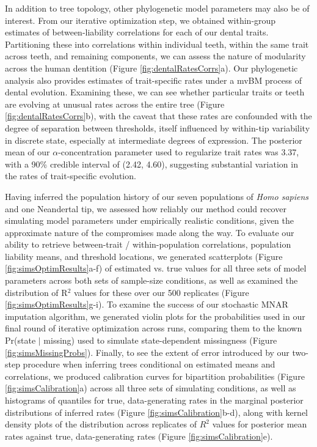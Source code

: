 In addition to tree topology, other phylogenetic model parameters may also be of interest. From our iterative optimization step, we obtained within-group estimates of between-liability correlations for each of our dental traits. Partitioning these into correlations within individual teeth, within the same trait across teeth, and remaining components, we can assess the nature of modularity across the human dentition (Figure \ref{fig:dentalRatesCorrs}a). Our phylogenetic analysis also provides estimates of trait-specific rates under a mvBM process of dental evolution. Examining these, we can see whether particular traits or teeth are evolving at unusual rates across the entire tree (Figure \ref{fig:dentalRatesCorrs}b), with the caveat that these rates are confounded with the degree of separation between thresholds, itself influenced by within-tip variability in discrete state, especially at intermediate degrees of expression. The posterior mean of our $\alpha$-concentration parameter used to regularize trait rates was 3.37, with a 90\% credible interval of (2.42, 4.60), suggesting substantial variation in the rates of trait-specific evolution.

Having inferred the population history of our seven populations of \textit{Homo sapiens} and one Neandertal tip, we assessed how reliably our method could recover simulating model parameters under empirically realistic conditions, given the approximate nature of the compromises made along the way. To evaluate our ability to retrieve between-trait / within-population correlations, population liability means, and threshold locations, we generated scatterplots (Figure \ref{fig:simsOptimResults}a-f) of estimated vs. true values for all three sets of model parameters across both sets of sample-size conditions, as well as examined the distribution of R$^2$ values for these over our 500 replicates (Figure \ref{fig:simsOptimResults}g-i). To examine the success of our stochastic MNAR imputation algorithm, we generated violin plots for the probabilities used in our final round of iterative optimization across runs, comparing them to the known Pr(state $\vert$ missing) used to simulate state-dependent missingness (Figure \ref{fig:simsMissingProbs}). Finally, to see the extent of error introduced by our two-step procedure when inferring trees conditional on estimated means and correlations, we produced calibration curves for bipartition probabilities (Figure \ref{fig:simsCalibration}a) across all three sets of simulating conditions, as well as histograms of quantiles for true, data-generating rates in the marginal posterior distributions of inferred rates (Figure \ref{fig:simsCalibration}b-d), along with kernel density plots of the distribution across replicates of $R^2$ values for posterior mean rates against true, data-generating rates (Figure \ref{fig:simsCalibration}e).

